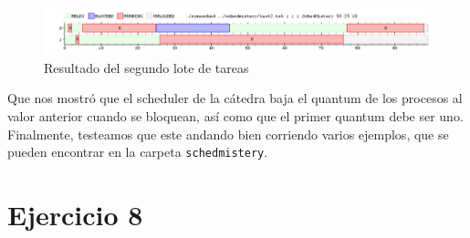 \documentclass{article}
\begin{document}
\begin{figure}[h!]
\caption{Resultado del segundo lote de tareas \label{grf:ex7-2}}
\centering
\includegraphics[width=15cm]{../ejercicios/ejercicio 7-2}
\end{figure}

Que nos mostró que el scheduler de la cátedra baja el quantum de los procesos al valor anterior cuando se bloquean, así como que el primer quantum debe ser uno. Finalmente, testeamos que este andando bien corriendo varios ejemplos, que se pueden encontrar en la carpeta \verb`schedmistery`.

\section{Ejercicio 8}
\end{document}
